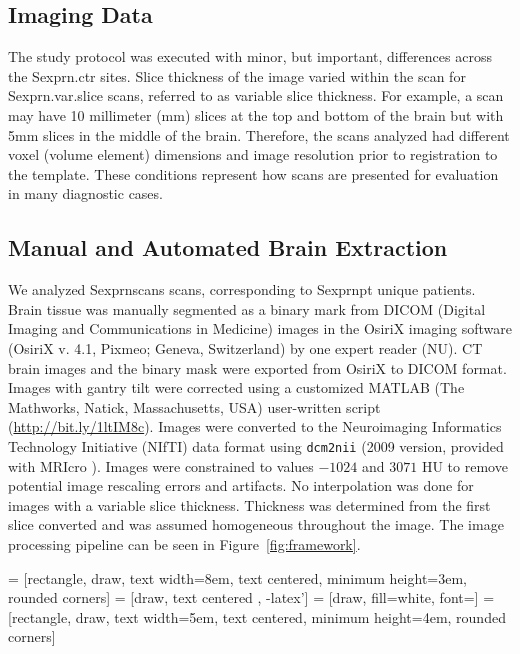 \documentclass{article}\usepackage[]{graphicx}\usepackage[]{color}
\begin{document}
\subsection{Imaging Data}
The study protocol was executed with minor, but important, differences across the Sexpr{n.ctr} sites.  
Slice thickness of the image varied within the scan for Sexpr{n.var.slice} scans, referred to as variable slice thickness. For example, a scan may have 10 millimeter (mm) slices at the top and bottom of the brain but with 5mm slices in the middle of the brain.  Therefore, the scans analyzed had different voxel (volume element) dimensions and image resolution prior to registration to the template.  These conditions represent how scans are presented for evaluation in many diagnostic cases.


\subsection{Manual and Automated Brain Extraction}
We analyzed Sexpr{nscans} scans, corresponding to Sexpr{npt} unique patients.  Brain tissue was manually segmented as a binary mark from DICOM (Digital Imaging and Communications in Medicine) images in the OsiriX imaging software (OsiriX v. 4.1, Pixmeo; Geneva, Switzerland) by one expert reader (NU). 
CT brain images and the binary mask were exported from OsiriX to DICOM format.  Images with gantry tilt were corrected using a customized MATLAB (The Mathworks, Natick, Massachusetts, USA) user-written script (\url{http://bit.ly/1ltIM8c}). 
Images were converted to the Neuroimaging Informatics Technology Initiative (NIfTI) data format using \verb|dcm2nii| (2009 version, provided with MRIcro \citep{rorden_stereotaxic_2000}).  Images were constrained to values $-1024$ and $3071$ HU to remove potential image rescaling errors and artifacts.  No interpolation was done for images with a variable slice thickness. Thickness was determined from the first slice converted and was assumed homogeneous throughout the image.  The image processing pipeline can be seen in Figure~\ref{fig:framework}.



 = [rectangle, draw, text width=8em, text centered, minimum height=3em, rounded corners]
 = [draw, text centered , -latex']
 = [draw, fill=white, font=\tiny ]
 = [rectangle, draw, text width=5em, text centered, minimum height=4em, rounded corners]    
\end{document}
